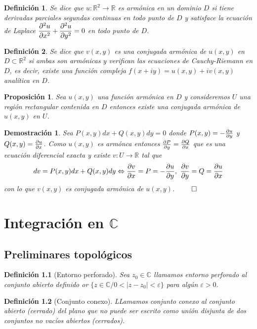 \documentclass[10pt]{book}
\newtheorem{defi}{Definición}[chapter]
\newtheorem{prop}{Proposición}[chapter]
\newtheorem*{dem}{Demostración}
\newcommand{\R}{\mathbb{R}}
\newcommand{\C}{\mathbb{C}}
\begin{document}
\begin{defi}
Se dice que $u: \R^2 \longrightarrow \R$ es armónica en un dominio $D$ si tiene derivadas parciales segundas continuas en todo punto de $D$ y satisface la ecuación de Laplace $\displaystyle \frac{\partial ^2 u}{\partial x^2} +  \frac{\partial ^2 u}{\partial y^2} =0$ en todo punto de $D$.
\end{defi}

\begin{defi}
Se dice que $v(x,y)$ es una conjugada armónica de $u(x,y)$ en $D\subset\R^2$ si ambas son armónicas y verifican las ecuaciones de Cauchy-Riemann en $D$, es decir, existe una función compleja $f(x+iy) = u(x,y)+iv(x,y)$ analítica en $D$.
\end{defi}

\begin{prop}
Sea $u(x,y)$ una función armónica en $D$ y consideremos $U$ una región rectangular contenida en $D$ entonces existe una conjugada armónica de $u(x,y)$ en  $U$.
\end{prop}

\begin{dem}
Sea $P(x,y)dx + Q(x,y)dy =0$ donde $P(x,y)= -\frac{\partial u}{\partial y}$ y $Q(x,y)= \frac{\partial u}{\partial x}$. Como $u(x,y)$ es armónca entonces $\frac{\partial P}{\partial y} = \frac{\partial Q}{\partial x}$ que es una ecuación diferencial exacta y existe $v: U \longrightarrow \R$ tal que 
$$dv = P(x,y)dx + Q(x,y)dy \Leftrightarrow \frac{\partial v}{\partial x} = P = -\frac{\partial u}{\partial y},\ \frac{\partial v}{\partial y} = Q = \frac{\partial u}{\partial x}$$
con lo que $v(x,y)$ es conjugada armónica de $u(x,y)$. $\qed$
\end{dem}
\chapter{Integración en $\C$}
\section{Preliminares topológicos}

\begin{defi}[Entorno perforado]
Sea $z_0 \in\C$ llamamos entorno perforado al conjunto abierto definido or $\{z\in\C / 0 < |z-z_0|<\varepsilon\}$ para algún $\varepsilon>0$.
\end{defi}

\begin{defi}[Conjunto conexo]
LLamamos conjunto conexo al conjunto abierto (cerrado) del plano  que no puede ser escrito como unión disjunta de dos conjuntos no vacíos abiertos (cerrados).
\end{defi}
\end{document}
